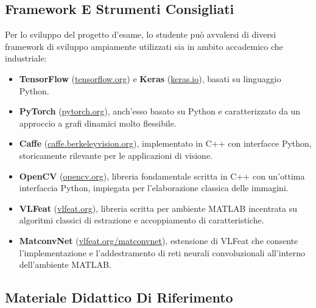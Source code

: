 ﻿\documentclass[11pt, a4paper]{article}
\begin{document}
\subsection{Framework E Strumenti Consigliati}

Per lo sviluppo del progetto d'esame, lo studente può avvalersi di diversi framework di sviluppo ampiamente utilizzati sia in ambito accademico che industriale:
\begin{itemize}[noitemsep]
    \item \textbf{TensorFlow} (\href{https://www.tensorflow.org/}{tensorflow.org}) e \textbf{Keras} (\href{https://keras.io/}{keras.io}), basati su linguaggio Python.
    \item \textbf{PyTorch} (\href{http://pytorch.org/}{pytorch.org}), anch'esso basato su Python e caratterizzato da un approccio a grafi dinamici molto flessibile.
    \item \textbf{Caffe} (\href{http://caffe.berkeleyvision.org/}{caffe.berkeleyvision.org}), implementato in C++ con interfacce Python, storicamente rilevante per le applicazioni di visione.
    \item \textbf{OpenCV} (\href{https://opencv.org/}{opencv.org}), libreria fondamentale scritta in C++ con un'ottima interfaccia Python, impiegata per l'elaborazione classica delle immagini.
    \item \textbf{VLFeat} (\href{http://www.vlfeat.org/}{vlfeat.org}), libreria scritta per ambiente MATLAB incentrata su algoritmi classici di estrazione e accoppiamento di caratteristiche.
    \item \textbf{MatconvNet} (\href{http://www.vlfeat.org/matconvnet/}{vlfeat.org/matconvnet}), estensione di VLFeat che consente l'implementazione e l'addestramento di reti neurali convoluzionali all'interno dell'ambiente MATLAB.
\end{itemize}


\subsection{Materiale Didattico Di Riferimento}
\end{document}
